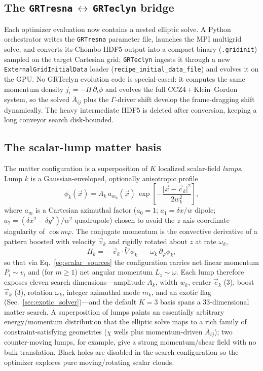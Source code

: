 \documentclass[twocolumn,floatfix,aps,prd,nofootinbib]{revtex4-2}
\begin{document}
\subsection{The \texttt{GRTresna}\,$\leftrightarrow$\,\texttt{GRTeclyn} bridge}

Each optimizer evaluation now contains a nested elliptic solve.  A Python
orchestrator writes the \texttt{GRTresna} parameter file, launches the MPI
multigrid solve, and converts its Chombo HDF5 output into a compact binary
(\texttt{.gridinit}) sampled on the target Cartesian grid; \texttt{GRTeclyn}
ingests it through a new \texttt{ExternalGridInitialData} loader
(\texttt{recipe\_initial\_data\_file}) and evolves it on the GPU.  No GRTeclyn
evolution code is special-cased: it computes the same momentum density
$j_i=-\Pi\,\partial_i\phi$ and evolves the full CCZ4\,+\,Klein--Gordon system, so
the solved $\bar A_{ij}$ plus the $\Gamma$-driver shift develop the
frame-dragging shift dynamically.  The heavy intermediate HDF5 is deleted after
conversion, keeping a long conveyor search disk-bounded.

\subsection{The scalar-lump matter basis}
\label{sec:lumps}

The matter configuration is a superposition of $K$ localized scalar-field
\emph{lumps}.  Lump $k$ is a Gaussian-enveloped, optionally anisotropic profile
\begin{equation}
\phi_k(\vec x)=A_k\,a_{m_k}\!(\vec x)\,
\exp\!\left[-\frac{\lvert\vec x-\vec c_k\rvert^2}{2w_k^2}\right],
\label{eq:lump_phi}
\end{equation}
where $a_m$ is a Cartesian azimuthal factor ($a_0=1$; $a_1=\delta x/w$ dipole;
$a_2=(\delta x^2-\delta y^2)/w^2$ quadrupole) chosen to avoid the $z$-axis
coordinate singularity of $\cos m\varphi$.  The conjugate momentum is the
convective derivative of a pattern boosted with velocity $\vec v_k$ and rigidly
rotated about $z$ at rate $\omega_k$,
\begin{equation}
\Pi_k=-\,\vec v_k\!\cdot\!\tilde\nabla\phi_k\;-\;\omega_k\,\partial_\varphi\phi_k,
\label{eq:lump_pi}
\end{equation}
so that via Eq.~\eqref{eq:scalar_sources} the configuration carries net linear
momentum $P_i\sim v_i$ and (for $m\ge1$) net angular momentum $L_z\sim\omega$.
Each lump therefore exposes eleven search dimensions---amplitude $A_k$, width
$w_k$, center $\vec c_k$ (3), boost $\vec v_k$ (3), rotation $\omega_k$, integer
azimuthal mode $m_k$, and an exotic flag (Sec.~\ref{sec:exotic_solver})---and the
default $K=3$ basis spans a $33$-dimensional matter search.  A superposition of
lumps paints an essentially arbitrary energy/momentum distribution that the
elliptic solve maps to a rich family of constraint-satisfying geometries
($\chi$ wells plus momentum-driven $\bar A_{ij}$); two counter-moving lumps, for
example, give a strong momentum/shear field with no bulk translation.  Black
holes are disabled in the search configuration so the optimizer explores pure
moving/rotating scalar clouds.
\end{document}

